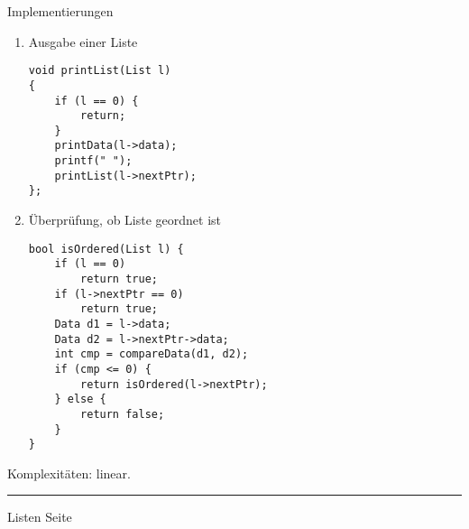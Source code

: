 \begin{slide}{}
\normalsize

\begin{center}
Implementierungen
\end{center}
\vspace*{0.5cm}

\footnotesize
\begin{enumerate}
\item Ausgabe einer Liste

\begin{verbatim}
void printList(List l)
{
    if (l == 0) {
        return;
    }
    printData(l->data);
    printf(" ");
    printList(l->nextPtr);
};
\end{verbatim}

\item Überpr\"ufung, ob Liste geordnet ist

\begin{verbatim}
bool isOrdered(List l) {
    if (l == 0)
        return true;
    if (l->nextPtr == 0)
        return true;
    Data d1 = l->data;
    Data d2 = l->nextPtr->data;
    int cmp = compareData(d1, d2);
    if (cmp <= 0) {
        return isOrdered(l->nextPtr);
    } else {
        return false;
    }
}
\end{verbatim}
\end{enumerate}
Komplexit\"aten: linear.

\vspace*{\fill}
\tiny \addtocounter{mypage}{1}
\rule{17cm}{1mm}
Listen  \hspace*{\fill} Seite 
\end{slide}


